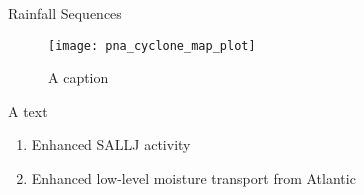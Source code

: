 \begin{block}{Rainfall Sequences}
    \begin{figure}[h]
        \caption{A caption}
        \texttt{[image: pna\_cyclone\_map\_plot]}
        \label{fig:example}
    \end{figure}
    A text
    \begin{enumerate}
        \item Enhanced SALLJ activity
        \item Enhanced low-level moisture transport from Atlantic
    \end{enumerate}
\end{block}
